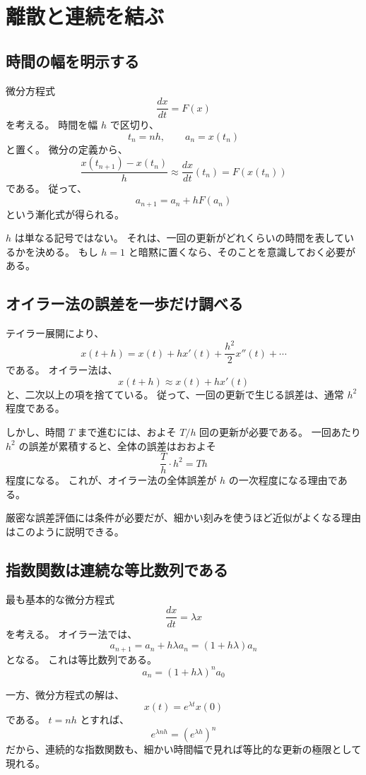 
\section{離散と連続を結ぶ}

\subsection{時間の幅を明示する}

微分方程式
\[
  \frac{dx}{dt}=F(x)
\]
を考える。
時間を幅 $h$ で区切り、
\[
  t_n=nh,\qquad a_n=x(t_n)
\]
と置く。
微分の定義から、
\[
  \frac{x(t_{n+1})-x(t_n)}h
  \approx \frac{dx}{dt}(t_n)
  =F(x(t_n))
\]
である。
従って、
\[
  a_{n+1}=a_n+hF(a_n)
\]
という漸化式が得られる。

$h$ は単なる記号ではない。
それは、一回の更新がどれくらいの時間を表しているかを決める。
もし $h=1$ と暗黙に置くなら、そのことを意識しておく必要がある。

\subsection{オイラー法の誤差を一歩だけ調べる}

テイラー展開により、
\[
  x(t+h)
  =x(t)+hx'(t)+\frac{h^2}{2}x''(t)+\cdots
\]
である。
オイラー法は、
\[
  x(t+h)\approx x(t)+hx'(t)
\]
と、二次以上の項を捨てている。
従って、一回の更新で生じる誤差は、通常 $h^2$ 程度である。

しかし、時間 $T$ まで進むには、およそ $T/h$ 回の更新が必要である。
一回あたり $h^2$ の誤差が累積すると、全体の誤差はおおよそ
\[
  \frac{T}{h}\cdot h^2=Th
\]
程度になる。
これが、オイラー法の全体誤差が $h$ の一次程度になる理由である。

厳密な誤差評価には条件が必要だが、細かい刻みを使うほど近似がよくなる理由はこのように説明できる。

\subsection{指数関数は連続な等比数列である}

最も基本的な微分方程式
\[
  \frac{dx}{dt}=\lambda x
\]
を考える。
オイラー法では、
\[
  a_{n+1}=a_n+h\lambda a_n
  =(1+h\lambda)a_n
\]
となる。
これは等比数列である。
\[
  a_n=(1+h\lambda)^n a_0
\]

一方、微分方程式の解は、
\[
  x(t)=e^{\lambda t}x(0)
\]
である。
$t=nh$ とすれば、
\[
  e^{\lambda nh}=\left(e^{\lambda h}\right)^n
\]
だから、連続的な指数関数も、細かい時間幅で見れば等比的な更新の極限として現れる。

